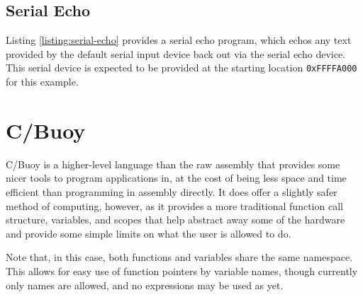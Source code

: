 \documentclass{article}
\begin{document}


\subsection{Serial Echo}

Listing \ref{listing:serial-echo} provides a serial echo program, which echos any text provided by the default serial input device back out via the serial echo device. This serial device is expected to be provided at the starting location \texttt{0xFFFFA000} for this example.



\pagebreak

\section{C/Buoy}

C/Buoy is a higher-level language than the raw assembly that provides some nicer tools to program applications in, at the cost of being less space and time efficient than programming in assembly directly. It does offer a slightly safer method of computing, however, as it provides a more traditional function call structure, variables, and scopes that help abstract away some of the hardware and provide some simple limits on what the user is allowed to do.

Note that, in this case, both functions and variables share the same namespace. This allows for easy use of function pointers by variable names, though currently only names are allowed, and no expressions may be used as yet.
\end{document}
